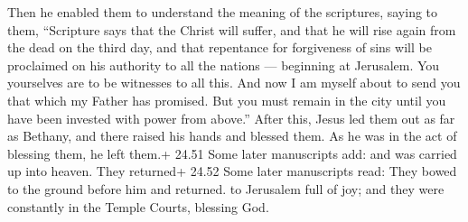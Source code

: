  Then he enabled them to understand the meaning of the
scriptures, saying to them,  ``Scripture says that the
Christ will suffer, and that he will rise again from the dead on the
third day,  and that repentance for forgiveness of sins
will be proclaimed on his authority to all the nations --- beginning at
Jerusalem.  You yourselves are to be witnesses to all this.
 And now I am myself about to send you that which my Father
has promised. But you must remain in the city until you have been
invested with power from above.''  After this, Jesus led
them out as far as Bethany, and there raised his hands and blessed them.
 As he was in the act of blessing them, he left them.+
24.51 Some later manuscripts add: and was carried up into heaven.
 They returned+ 24.52 Some later manuscripts read: They
bowed to the ground before him and returned. to Jerusalem full of joy;
 and they were constantly in the Temple Courts, blessing
God.

